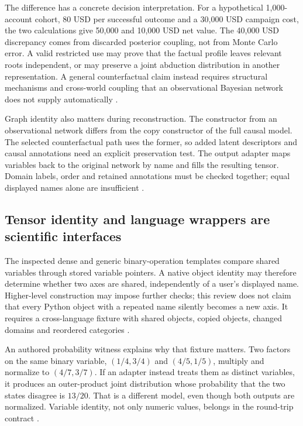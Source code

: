 The difference has a concrete decision interpretation. For a hypothetical
1,000-account cohort, 80 USD per successful outcome and a 30,000 USD
campaign cost, the two calculations give 50,000 and 10,000 USD net value.
The 40,000 USD discrepancy comes from discarded posterior coupling, not
from Monte Carlo error. A valid restricted use may prove that the factual
profile leaves relevant roots independent, or may preserve a joint
abduction distribution in another representation. A general counterfactual
claim instead requires structural mechanisms and cross-world coupling that
an observational Bayesian network does not supply automatically
\citep{exec24_agrum_choice}.

Graph identity also matters during reconstruction. The constructor from an
observational network differs from the copy constructor of the full causal
model. The selected counterfactual path uses the former, so added latent
descriptors and causal annotations need an explicit preservation test.
The output adapter maps variables back to the original network by name and
fills the resulting tensor. Domain labels, order and retained annotations
must be checked together; equal displayed names alone are insufficient
\citep{exec24_agrum_source}.

\subsection{Tensor identity and language wrappers are scientific interfaces}
The inspected dense and generic binary-operation templates compare shared
variables through stored variable pointers. A native object identity may
therefore determine whether two axes are shared, independently of a user's
displayed name. Higher-level construction may impose further checks; this
review does not claim that every Python object with a repeated name silently
becomes a new axis. It requires a cross-language fixture with shared objects,
copied objects, changed domains and reordered categories
\citep{exec24_agrum_source}.

An authored probability witness explains why that fixture matters. Two
factors on the same binary variable, $(1/4,3/4)$ and $(4/5,1/5)$, multiply
and normalize to $(4/7,3/7)$. If an adapter instead treats them as distinct
variables, it produces an outer-product joint distribution whose
probability that the two states disagree is $13/20$. That is a different
model, even though both outputs are normalized. Variable identity, not only
numeric values, belongs in the round-trip contract
\citep{exec24_agrum_choice}.

